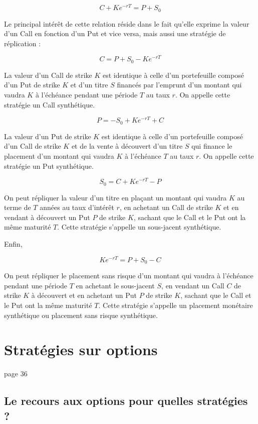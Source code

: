 \documentclass[a4paper, 12pt]{report}
\begin{document}
\[
C + K e^{-rT} = P + S_0 
\]

Le principal intérêt de cette relation réside dans le fait qu’elle exprime la valeur d’un Call en fonction d’un Put et vice versa, mais aussi une stratégie de réplication :

\[
C = P + S_0 - K e^{-rT} 
\]

La valeur d’un Call de strike \( K \) est identique à celle d’un portefeuille composé d’un Put de strike \( K \) et d’un titre \( S \) financés par l’emprunt d’un montant qui vaudra \( K \) à l’échéance pendant une période \( T \) au taux \( r \). On appelle cette stratégie un Call synthétique.

\[
P = -S_0 + K e^{-rT} + C 
\]

La valeur d’un Put de strike \( K \) est identique à celle d’un portefeuille composé d’un Call de strike \( K \) et de la vente à découvert d’un titre \( S \) qui finance le placement d’un montant qui vaudra \( K \) à l’échéance \( T \) au taux \( r \). On appelle cette stratégie un Put synthétique.

\[
S_0 = C + K e^{-rT} - P 
\]

On peut répliquer la valeur d’un titre en plaçant un montant qui vaudra \( K \) au terme de \( T \) années au taux d’intérêt \( r \), en achetant un Call de strike \( K \) et en vendant à découvert un Put \( P \) de strike \( K \), sachant que le Call et le Put ont la même maturité \( T \). Cette stratégie s’appelle un sous-jacent synthétique.

Enfin,

\[
K e^{-rT} = P + S_0 - C 
\]

On peut répliquer le placement sans risque d’un montant qui vaudra à l’échéance pendant une période \( T \) en achetant le sous-jacent \( S \), en vendant un Call \( C \) de strike \( K \) à découvert et en achetant un Put \( P \) de strike \( K \), sachant que le Call et le Put ont la même maturité \( T \). Cette stratégie s’appelle un placement monétaire synthétique ou placement sans risque synthétique.

\section{Stratégies sur options}

page 36

\subsection{Le recours aux options pour quelles stratégies ?}
\end{document}
